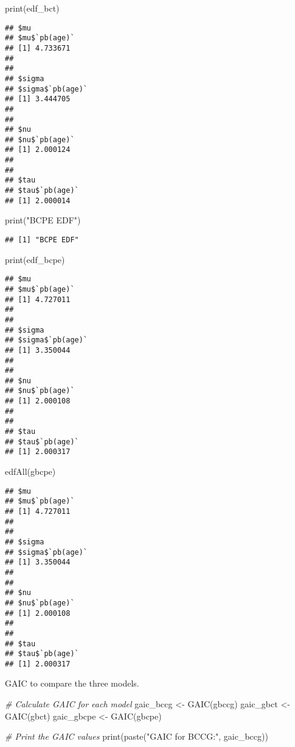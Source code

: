 \documentclass[
]{article}
\newenvironment{Shaded}{\begin{snugshade}}{\end{snugshade}}
\newcommand{\CommentTok}[1]{\textcolor[rgb]{0.56,0.35,0.01}{\textit{#1}}}
\newcommand{\FunctionTok}[1]{\textcolor[rgb]{0.00,0.00,0.00}{#1}}
\newcommand{\NormalTok}[1]{#1}
\newcommand{\OtherTok}[1]{\textcolor[rgb]{0.56,0.35,0.01}{#1}}
\newcommand{\StringTok}[1]{\textcolor[rgb]{0.31,0.60,0.02}{#1}}
\begin{document}
\begin{Shaded}
\begin{Highlighting}[]
\FunctionTok{print}\NormalTok{(edf\_bct)}
\end{Highlighting}
\end{Shaded}

\begin{verbatim}
## $mu
## $mu$`pb(age)`
## [1] 4.733671
## 
## 
## $sigma
## $sigma$`pb(age)`
## [1] 3.444705
## 
## 
## $nu
## $nu$`pb(age)`
## [1] 2.000124
## 
## 
## $tau
## $tau$`pb(age)`
## [1] 2.000014
\end{verbatim}

\begin{Shaded}
\begin{Highlighting}[]
\FunctionTok{print}\NormalTok{(}\StringTok{"BCPE EDF"}\NormalTok{)}
\end{Highlighting}
\end{Shaded}

\begin{verbatim}
## [1] "BCPE EDF"
\end{verbatim}

\begin{Shaded}
\begin{Highlighting}[]
\FunctionTok{print}\NormalTok{(edf\_bcpe)}
\end{Highlighting}
\end{Shaded}

\begin{verbatim}
## $mu
## $mu$`pb(age)`
## [1] 4.727011
## 
## 
## $sigma
## $sigma$`pb(age)`
## [1] 3.350044
## 
## 
## $nu
## $nu$`pb(age)`
## [1] 2.000108
## 
## 
## $tau
## $tau$`pb(age)`
## [1] 2.000317
\end{verbatim}

\begin{Shaded}
\begin{Highlighting}[]
\FunctionTok{edfAll}\NormalTok{(gbcpe)}
\end{Highlighting}
\end{Shaded}

\begin{verbatim}
## $mu
## $mu$`pb(age)`
## [1] 4.727011
## 
## 
## $sigma
## $sigma$`pb(age)`
## [1] 3.350044
## 
## 
## $nu
## $nu$`pb(age)`
## [1] 2.000108
## 
## 
## $tau
## $tau$`pb(age)`
## [1] 2.000317
\end{verbatim}

GAIC to compare the three models.

\begin{Shaded}
\begin{Highlighting}[]
\CommentTok{\# Calculate GAIC for each model}
\NormalTok{gaic\_bccg }\OtherTok{\textless{}{-}} \FunctionTok{GAIC}\NormalTok{(gbccg)}
\NormalTok{gaic\_gbct }\OtherTok{\textless{}{-}} \FunctionTok{GAIC}\NormalTok{(gbct)}
\NormalTok{gaic\_gbcpe }\OtherTok{\textless{}{-}} \FunctionTok{GAIC}\NormalTok{(gbcpe)}

\CommentTok{\# Print the GAIC values}
\FunctionTok{print}\NormalTok{(}\FunctionTok{paste}\NormalTok{(}\StringTok{"GAIC for BCCG:"}\NormalTok{, gaic\_bccg))}
\end{Highlighting}
\end{Shaded}
\end{document}
